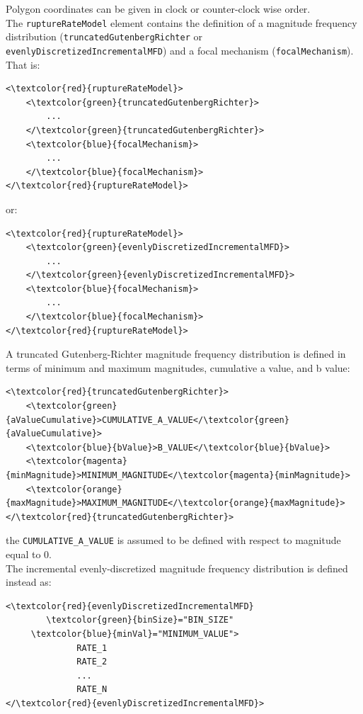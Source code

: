 Polygon coordinates can be given in clock or counter-clock wise order.\\
The \Verb+ruptureRateModel+ element contains the definition of a magnitude frequency distribution (\Verb+truncatedGutenbergRichter+ or \Verb+evenlyDiscretizedIncrementalMFD+) and a focal mechanism (\Verb+focalMechanism+). That is:
\begin{Verbatim}[frame=single, commandchars=\\\{\},fontsize=\normalsize, samepage=true]
<\textcolor{red}{ruptureRateModel}>
	<\textcolor{green}{truncatedGutenbergRichter}>
		...
	</\textcolor{green}{truncatedGutenbergRichter}>
	<\textcolor{blue}{focalMechanism}>
		...
	</\textcolor{blue}{focalMechanism}>
</\textcolor{red}{ruptureRateModel}>
\end{Verbatim}
or:
\begin{Verbatim}[frame=single, commandchars=\\\{\},fontsize=\normalsize, samepage=true]
<\textcolor{red}{ruptureRateModel}>
	<\textcolor{green}{evenlyDiscretizedIncrementalMFD}>
		...
	</\textcolor{green}{evenlyDiscretizedIncrementalMFD}>
	<\textcolor{blue}{focalMechanism}>
		...
	</\textcolor{blue}{focalMechanism}>
</\textcolor{red}{ruptureRateModel}>
\end{Verbatim}
A truncated Gutenberg-Richter magnitude frequency distribution is defined in terms of minimum and maximum magnitudes, cumulative a value, and b value:
\begin{Verbatim}[frame=single, commandchars=\\\{\},fontsize=\normalsize, samepage=true]
<\textcolor{red}{truncatedGutenbergRichter}>
	<\textcolor{green}{aValueCumulative}>CUMULATIVE_A_VALUE</\textcolor{green}{aValueCumulative}>
	<\textcolor{blue}{bValue}>B_VALUE</\textcolor{blue}{bValue}>
	<\textcolor{magenta}{minMagnitude}>MINIMUM_MAGNITUDE</\textcolor{magenta}{minMagnitude}>
	<\textcolor{orange}{maxMagnitude}>MAXIMUM_MAGNITUDE</\textcolor{orange}{maxMagnitude}>
</\textcolor{red}{truncatedGutenbergRichter}>
\end{Verbatim}
the \Verb+CUMULATIVE_A_VALUE+ is assumed to be defined with respect to magnitude equal to 0.\\
The incremental evenly-discretized magnitude frequency distribution is defined instead as:
\begin{Verbatim}[frame=single, commandchars=\\\{\},fontsize=\normalsize, samepage=true]
<\textcolor{red}{evenlyDiscretizedIncrementalMFD} 
        \textcolor{green}{binSize}="BIN_SIZE"
 	 \textcolor{blue}{minVal}="MINIMUM_VALUE">
              RATE_1
              RATE_2
              ...
              RATE_N
</\textcolor{red}{evenlyDiscretizedIncrementalMFD}>
\end{Verbatim}
